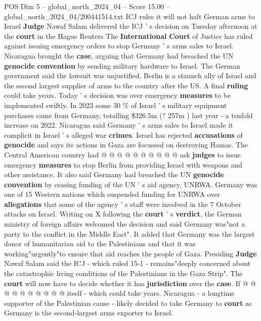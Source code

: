 \begin{textsample}{POS Dim 5 – global\_north\_2024\_04 – Score 15.00 – global\_north\_2024\_04/200441514.txt}  \label{ex:f5_pos_270}
ICJ rules it will not halt German arms to Israel \textbf{Judge} Nawaf Salam delivered the ICJ ' s decision on Tuesday afternoon at the \textbf{court} in the Hague Reuters The \textbf{International} \textbf{Court} of Justice has ruled against issuing emergency orders to stop Germany ' s arms sales to Israel.
Nicaragua brought the \textbf{case}, arguing that Germany had breached the UN \textbf{genocide} \textbf{convention} by sending military hardware to Israel.
The German government said the lawsuit was unjustified.
Berlin is a staunch ally of Israel and the second largest supplier of arms to the country after the US.
A final \textbf{ruling} could take years.
Today ' s decision was over emergency \textbf{measures} to be implemented swiftly.
In 2023 some 30 \% of Israel ' s military equipment purchases came from Germany, totalling \$326.5m (? 257m ) last year - a tenfold increase on 2022.
Nicaragua said Germany ' s arms sales to Israel made it complicit in Israel ' s alleged war \textbf{crimes}.
Israel has rejected \textbf{accusations} of \textbf{genocide} and says its actions in Gaza are focussed on destroying Hamas.
The Central American country had @ @ @ @ @ @ @ @ @ @ ask \textbf{judges} to issue emergency \textbf{measures} to stop Berlin from providing Israel with weapons and other assistance.
It also said Germany had breached the UN \textbf{genocide} \textbf{convention} by ceasing funding of the UN ' s aid agency, UNRWA.
Germany was one of 15 Western nations which suspended funding for UNRWA over \textbf{allegations} that some of the agency ' s staff were involved in the 7 October attacks on Israel.
Writing on X following the \textbf{court} ' s \textbf{verdict}, the German ministry of foreign affairs welcomed the decision and said Germany was"not a party to the conflict in the Middle East".
It added that Germany was the largest donor of humanitarian aid to the Palestinians and that it was working"urgently"to ensure that aid reaches the people of Gaza.
Presiding \textbf{Judge} Nawaf Salam said the ICJ - which ruled 15-1 - remains"deeply concerned about the catastrophic living conditions of the Palestinians in the Gaza Strip".
The \textbf{court} will now have to decide whether it has \textbf{jurisdiction} over the \textbf{case}.
If @ @ @ @ @ @ @ @ @ @ itself - which could take years.
Nicaragua - a longtime supporter of the Palestinian cause - likely decided to take Germany to \textbf{court} as Germany is the second-largest arms exporter to Israel.

\end{textsample}
